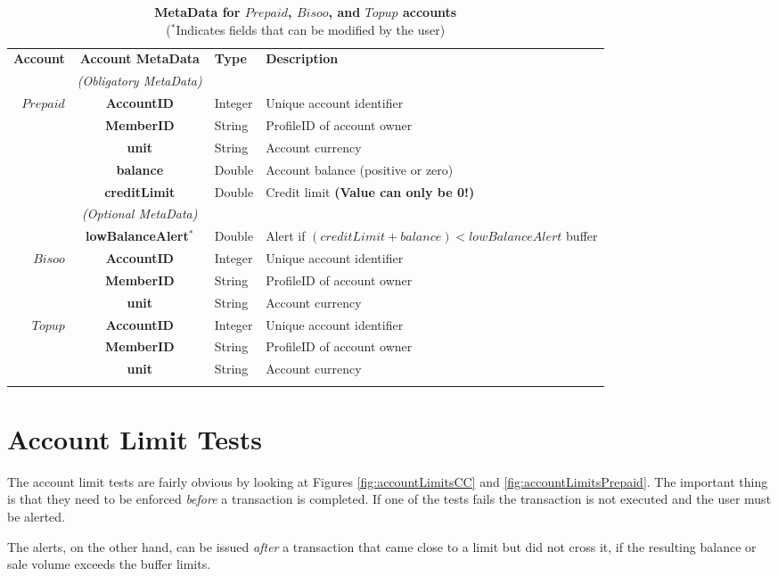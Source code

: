 \begin{table}[H]
\begin{centering}
\small
{
\begin{tabular}{ r | c | l | l }
\hline
\textbf{Account}	& {\bf Account MetaData} & {\bf Type} & {\bf Description} \\
\Xhline{1.5pt}
			 & \emph{(Obligatory MetaData)}& & \\
\cline{2-2}
$Prepaid$ 	& {\bf AccountID}			&Integer	& Unique account identifier \\
			& {\bf MemberID}			&String	& ProfileID of account owner \\
			& {\bf unit}					&String	& Account currency \\
			& {\bf balance}				&Double	& Account balance (positive or zero) \\
			& {\bf creditLimit}			&Double	& Credit limit {\bf (Value can only be 0!)} \\
\cline{2-2}
			 & \emph{(Optional MetaData)}& & \\
\cline{2-2}
			& {\bf lowBalanceAlert$^*$}		&Double	& Alert if $(creditLimit + balance) < lowBalanceAlert$ buffer \\
\Xhline{1.5pt}
$Bisoo$ 		& {\bf AccountID}			&Integer	& Unique account identifier \\
			& {\bf MemberID}			&String	& ProfileID of account owner \\
			& {\bf unit}					&String	& Account currency \\
\Xhline{1.5pt}
$Topup$ 		& {\bf AccountID}			&Integer	& Unique account identifier \\
			& {\bf MemberID}			&String	& ProfileID of account owner \\
			& {\bf unit}					&String	& Account currency \\
\Xhline{1.5pt}
\end{tabular}
}
\caption{\small\textbf{MetaData for $Prepaid$, $Bisoo$, and $Topup$ accounts}\\
($^*$Indicates fields that can be modified by the user)}
\label{tab:AccountMetaData2}
\end{centering}
\end{table}

\section{Account Limit Tests}
The account limit tests are fairly obvious by looking at Figures \ref{fig:accountLimitsCC} and \ref{fig:accountLimitsPrepaid}. The important thing is that they need to be enforced \emph{before} a transaction is completed. If one of the tests fails the transaction is not executed and the user must be alerted.

The alerts, on the other hand, can be issued \emph{after} a transaction that came close to a limit but did not cross it, if the resulting balance or sale volume exceeds the buffer limits.



























